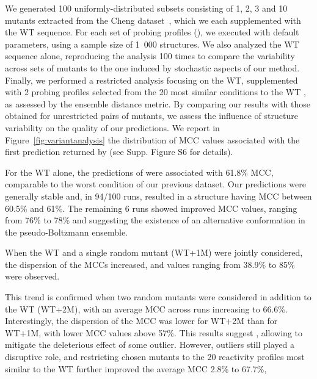 \documentclass[a4,center,fleqn]{NAR}
\begin{document}
We generated 100 uniformly-distributed subsets consisting of 1, 2, 3 and 10 mutants extracted from the Cheng dataset~\cite{Cheng2017}, which we each supplemented with the WT sequence.
For each set of probing profiles (), we executed \OurTool{} with default parameters, using a sample size of 1~000 structures. 
We also analyzed the WT sequence alone, reproducing the analysis 100 times to compare the variability across sets of mutants to the one induced by stochastic aspects of our method. 
Finally, we performed a restricted analysis focusing on the WT, supplemented with 2 probing profiles selected from the 20 most similar conditions to the WT , as assessed by the ensemble distance metric. By comparing our results with those obtained for unrestricted pairs of mutants, we assess the influence of structure variability on the quality of our predictions. We report in Figure~\ref{fig:variantanalysis} the distribution of MCC values associated with the first prediction returned by \OurTool (see Supp. Figure S6 for details).

For the WT alone, the predictions of \OurTool were associated with 61.8\% MCC, comparable to the worst condition of our previous dataset.
Our predictions were generally stable and, in 94/100 runs, resulted in a structure having MCC between 60.5\% and 61\%. The remaining 6 runs showed improved MCC values, ranging from 76\% to 78\% and suggesting the existence of an alternative conformation in the pseudo-Boltzmann ensemble.

When the WT and a single random mutant (WT+1M) were jointly considered, the dispersion of the MCCs increased, and values ranging from 38.9\% to 85\% were observed.%

This trend is confirmed when two random mutants were considered in addition to the WT (WT+2M), with an average MCC across runs increasing to 66.6\%. %
Interestingly, the dispersion of the MCC was lower for WT+2M than for WT+1M, with lower MCC values above 57\%.  This results suggest , allowing to mitigate the deleterious effect of some outlier.
However, outliers still played a disruptive role, and restricting chosen mutants to the 20 reactivity profiles most similar to the WT further improved the average MCC 2.8\% to 67.7\%,  
\end{document}
